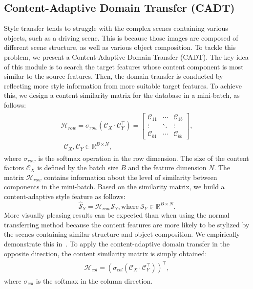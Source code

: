 \documentclass[final]{cvpr}
\begin{document}
\subsection{Content-Adaptive Domain Transfer (CADT) }
Style transfer tends to struggle with the complex scenes containing various objects, such as a driving scene.
This is because those images are composed of different scene structure, as well as various object composition.
To tackle this problem, we present a Content-Adaptive Domain Transfer (CADT).
The key idea of this module is to search the target features whose content component is most similar to the source features.
Then, the domain transfer is conducted by reflecting more style information from more suitable target features.
To achieve this, we design a content similarity matrix for the database in a mini-batch, as follows:
\begin{gather}
\begin{split}
\label{eq:csim}
\mathcal{H}_{row} = \sigma _{row} \left( \mathbf{\mathcal{C}}_X \cdot \mathbf{\mathcal{C}}_Y^\top \right) = \left[ \begin{matrix} \mathcal{C}_{11} & \cdots & \mathcal{C}_{1b} \\ \vdots & \ddots & \vdots \\ \mathcal{C}_{b1} & \cdots & \mathcal{C}_{bb} \end{matrix} \right], \\~~
\mathbf{\mathcal{C}}_X, \mathbf{\mathcal{C}}_Y \in \mathbb{R}^{B \times N},
\end{split}
\end{gather}
where $\sigma_{row}$ is the softmax operation in the row dimension.
The size of the content factors $\mathcal{C}_X$ is defined by the batch size $B$ and the feature dimension $N$.
The matrix $\mathcal{H}_{row}$ contains information about the level of similarity between components in the mini-batch.
Based on the similarity matrix, we build a content-adaptive style feature as follows:
\begin{equation}
    \hat{\mathcal{S}}_Y = \mathcal{H}_{row}\mathcal{S}_Y, \text{where}~\mathcal{S}_Y \in \mathbb{R}^{B \times N}.
\end{equation}
More visually pleasing results can be expected than when using the normal transferring method because the content features are more likely to be stylized by the scenes containing similar structure and object composition.
We empirically demonstrate this in~.
To apply the content-adaptive domain transfer in the opposite direction, the content similarity matrix is simply obtained:
\begin{gather}
\begin{split}
\mathcal{H}_{col} = \left( \sigma_{col} \left( \mathbf{\mathcal{C}}_X \cdot \mathbf{\mathcal{C}}_Y^\top \right) \right)^\top,
\end{split}
\end{gather}
where $\sigma_{col}$ is the softmax in the column direction.
\end{document}
